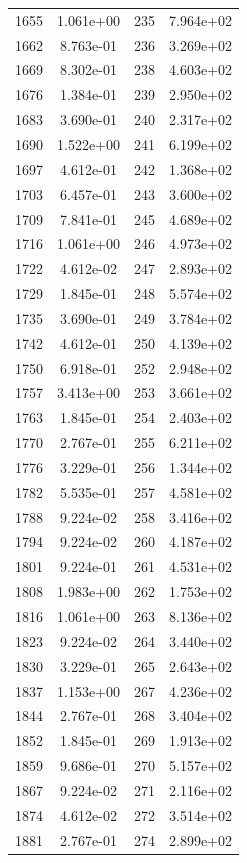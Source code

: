 \documentclass[12pt]{article}
\begin{document}
\begin{longtable}{@{}cccc@{}}
1655 & 1.061e+00 & 235 & 7.964e+02 \\
1662 & 8.763e-01 & 236 & 3.269e+02 \\
1669 & 8.302e-01 & 238 & 4.603e+02 \\
1676 & 1.384e-01 & 239 & 2.950e+02 \\
1683 & 3.690e-01 & 240 & 2.317e+02 \\
1690 & 1.522e+00 & 241 & 6.199e+02 \\
1697 & 4.612e-01 & 242 & 1.368e+02 \\
1703 & 6.457e-01 & 243 & 3.600e+02 \\
1709 & 7.841e-01 & 245 & 4.689e+02 \\
1716 & 1.061e+00 & 246 & 4.973e+02 \\
1722 & 4.612e-02 & 247 & 2.893e+02 \\
1729 & 1.845e-01 & 248 & 5.574e+02 \\
1735 & 3.690e-01 & 249 & 3.784e+02 \\
1742 & 4.612e-01 & 250 & 4.139e+02 \\
1750 & 6.918e-01 & 252 & 2.948e+02 \\
1757 & 3.413e+00 & 253 & 3.661e+02 \\
1763 & 1.845e-01 & 254 & 2.403e+02 \\
1770 & 2.767e-01 & 255 & 6.211e+02 \\
1776 & 3.229e-01 & 256 & 1.344e+02 \\
1782 & 5.535e-01 & 257 & 4.581e+02 \\
1788 & 9.224e-02 & 258 & 3.416e+02 \\
1794 & 9.224e-02 & 260 & 4.187e+02 \\
1801 & 9.224e-01 & 261 & 4.531e+02 \\
1808 & 1.983e+00 & 262 & 1.753e+02 \\
1816 & 1.061e+00 & 263 & 8.136e+02 \\
1823 & 9.224e-02 & 264 & 3.440e+02 \\
1830 & 3.229e-01 & 265 & 2.643e+02 \\
1837 & 1.153e+00 & 267 & 4.236e+02 \\
1844 & 2.767e-01 & 268 & 3.404e+02 \\
1852 & 1.845e-01 & 269 & 1.913e+02 \\
1859 & 9.686e-01 & 270 & 5.157e+02 \\
1867 & 9.224e-02 & 271 & 2.116e+02 \\
1874 & 4.612e-02 & 272 & 3.514e+02 \\
1881 & 2.767e-01 & 274 & 2.899e+02 \\

\end{longtable}
\end{document}

